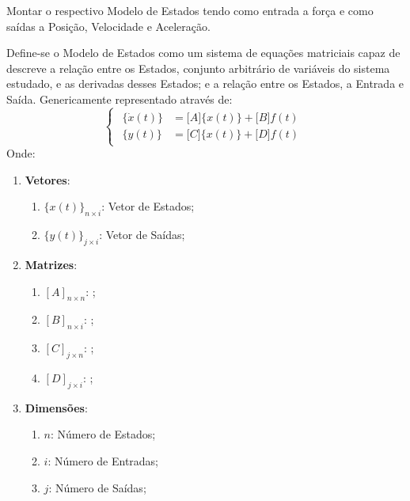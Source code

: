 \documentclass{article}
\begin{document}
\newpage
\begin{exercise}\label{ex14}
    Montar o respectivo Modelo de Estados tendo como entrada a força e como saídas a Posição, Velocidade e Aceleração.
\end{exercise}
\begin{resolution}
    Define-se o Modelo de Estados como um sistema de equações matriciais capaz de descreve a relação entre os Estados, conjunto arbitrário de variáveis do sistema estudado, e as derivadas desses Estados; e a relação entre os Estados, a Entrada e Saída. Genericamente representado através de:
    \begin{equation}
    \begin{cases}
    \begin{aligned}
        \lbrace \dot{x}(t) \rbrace &= 
        \lbrack A \rbrack \lbrace x(t) \rbrace + \lbrack B \rbrack f(t)\\
        \lbrace y(t) \rbrace &= 
        \lbrack C \rbrack \lbrace x(t) \rbrace + \lbrack D \rbrack f(t)
    \end{aligned}
    \end{cases}
    \end{equation}
    Onde:
    \begin{enumerate}
        \item \textbf{Vetores}:
        \begin{enumerate}
            \item $\lbrace x(t) \rbrace_{n\times i}$: Vetor de Estados;
            \item $\lbrace y(t) \rbrace_{j\times i}$: Vetor de Saídas;
        \end{enumerate}
        \item \textbf{Matrizes}:
        \begin{enumerate}
            \item $[A]_{n\times n}$: ;
            \item $[B]_{n\times i}$: ;
            \item $[C]_{j\times n}$: ;
            \item $[D]_{j\times i}$: ;
        \end{enumerate}
        \item \textbf{Dimensões}:
        \begin{enumerate}[noitemsep]
            \item $n$: Número de Estados;
            \item $i$: Número de Entradas;
            \item $j$: Número de Saídas;

\end{enumerate}
\end{enumerate}
\end{resolution}
\end{document}
